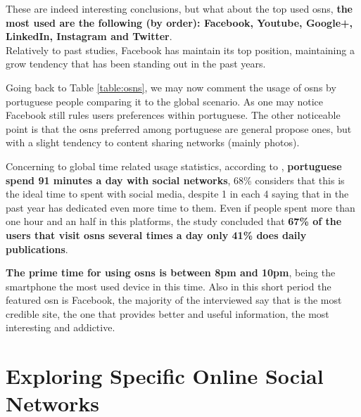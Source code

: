 \indent These are indeed interesting conclusions, but what about the top used \glspl{osn}, \textbf{the most used are
the following (by order): Facebook, Youtube, Google+, LinkedIn, Instagram and Twitter}.\\
\indent Relatively to \cite{marktest2016} past studies, Facebook has maintain
its top position, maintaining a grow tendency that has been standing out in the past years.

\indent Going back to Table \ref{table:osns}, we may now comment the usage of \glspl{osn} by portuguese people comparing it
to the global scenario. As one may notice Facebook still rules users preferences within portuguese.
The other noticeable point is that the \glspl{osn} preferred among portuguese are general propose ones,
but with a slight tendency to content sharing networks (mainly photos).

\indent Concerning to global time related usage statistics, according to \cite{marktest2016}, \textbf{portuguese spend 91 minutes a day with social networks},
68\% considers that this is the ideal time to spent with social media, despite 1 in each 4 saying that in the past year has dedicated even more time to them.
Even if people spent more than one hour and an half in this platforms, the study
concluded that \textbf{67\% of the users that visit \glspl{osn} several times a day only 41\% does daily publications}.

\indent \textbf{The prime time for using \glspl{osn} is between 8pm and 10pm}, being the smartphone the most used device in this time. Also in this short period the
featured \gls{osn} is Facebook, the majority of the interviewed say that is the most credible site, the one that provides better and useful information,
the most interesting and addictive.


\section{Exploring Specific Online Social Networks}

